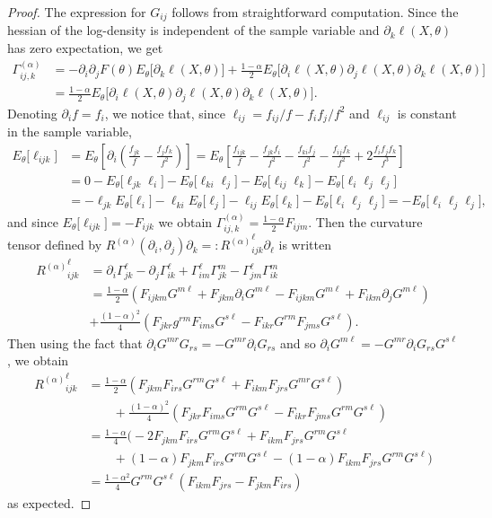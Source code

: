 \documentclass[10pt,a4paper]{amsart}
\begin{document}
\begin{proof}
The expression for $G_{ij}$ follows from straightforward computation. Since the hessian of the log-density is independent of the sample variable and $\partial_k\ell(X,\theta)$ has zero expectation, we get
\begin{align*}
\Gamma^{(\alpha)}_{ij,k}&=-\partial_i\partial_jF(\theta)E_\theta\big[\partial_k\ell(X,\theta)\big]+\frac{1-\alpha}{2}E_\theta\big[\partial_i\ell(X,\theta)\partial_j\ell(X,\theta)\partial_k\ell(X,\theta)\big]\\
&=\frac{1-\alpha}{2}E_\theta\big[\partial_i\ell(X,\theta)\partial_j\ell(X,\theta)\partial_k\ell(X,\theta)\big].
\end{align*}
Denoting $\partial_if=f_i$, we notice that, since $\ell_{ij}=f_{ij}/f- f_{i}f_j/f^2$ and $\ell_{ij}$ is constant in the sample variable,
\begin{align*}
E_\theta\big[\ell_{ijk}\big]&=E_\theta\left[\partial_i\left(\frac{f_{jk}}{f}-\frac{f_jf_k}{f^2}\right)\right]=E_\theta\left[\frac{f_{ijk}}{f}-\frac{f_{jk}f_i}{f^2}-\frac{f_{ki}f_j}{f^2}-\frac{f_{ij}f_k}{f^2}+2\frac{f_if_jf_k}{f^3}\right]\\
&=0-E_\theta\big[\ell_{jk}\ell_i\big]-E_\theta\big[\ell_{ki}\ell_j\big]-E_\theta\big[\ell_{ij}\ell_k\big]-E_\theta\big[\ell_i\ell_j\ell_j\big]\\
&=-\ell_{jk}E_\theta\big[\ell_i\big]-\ell_{ki}E_\theta\big[\ell_j\big]-\ell_{ij}E_\theta\big[\ell_k\big]-E_\theta\big[\ell_i\ell_j\ell_j\big]=-E_\theta\big[\ell_i\ell_j\ell_j\big],
\end{align*}
and since $E_\theta\big[\ell_{ijk}\big]=-F_{ijk}$ we obtain $\Gamma_{ij,k}^{(\alpha)}=\frac{1-\alpha}{2}F_{ijm}$. Then the curvature tensor defined by $R^{(\alpha)}(\partial_i,\partial_j)\partial_k=:{R^{(\alpha)}}_{ijk}^\ell \partial_\ell$ is written
\begin{align*}
{R^{(\alpha)}}_{ijk}^\ell&=\partial_i\Gamma_{jk}^\ell -\partial_j\Gamma_{ik}^\ell+\Gamma_{im}^\ell\Gamma_{jk}^m-\Gamma_{jm}^\ell\Gamma_{ik}^m\\
&=\frac{1-\alpha}{2}\left(F_{ijkm}G^{m\ell}+F_{jkm}\partial_iG^{m\ell}-F_{ijkm}G^{m\ell}+F_{ikm}\partial_jG^{m\ell}\right)\\
&+\frac{(1-\alpha)^2}{4}\left(F_{jkr}g^{rm}F_{ims}G^{s\ell}-F_{ikr}G^{rm}F_{jms}G^{s\ell}\right).
\end{align*}
Then using the fact that $\partial_iG^{mr}G_{rs}=-G^{mr}\partial_iG_{rs}$ and so $\partial_iG^{m\ell}=-G^{mr}\partial_iG_{rs}G^{s\ell}$, we obtain
\begin{align*}
{R^{(\alpha)}}_{ijk}^\ell&=\frac{1-\alpha}{2}\left(F_{jkm}F_{irs}G^{rm}G^{s\ell}+F_{ikm}F_{jrs}G^{mr}G^{s\ell}\right)\\&\qquad+\frac{(1-\alpha)^2}{4}\left(F_{jkr}F_{ims}G^{rm}G^{s\ell}-F_{ikr}F_{jms}G^{rm}G^{s\ell}\right)\\
&=\frac{1-\alpha}{4}\bigg(-2F_{jkm}F_{irs}G^{rm}G^{s\ell}+F_{ikm}F_{jrs}G^{rm}G^{s\ell}\\&\qquad+(1-\alpha)F_{jkm}F_{irs}G^{rm}G^{s\ell}-(1-\alpha)F_{ikm}F_{jrs}G^{rm}G^{s\ell}\bigg)\\
&=\frac{1-\alpha^2}{4}G^{rm}G^{s\ell}\left(F_{ikm}F_{jrs}-F_{jkm}F_{irs}\right)
\end{align*}
as expected.
\end{proof}
\end{document}
